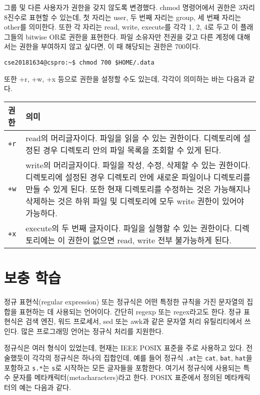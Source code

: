 그룹 및 다른 사용자가 권한을 갖지 않도록 변경했다. chmod 명령어에서 권한은 3자리 8진수로 표현할 수 있는데, 첫 자리는 user, 두 번째 자리는 group, 세 번째 자리는 other를 의미한다. 또한 각 자리는 read, write, execute를 각각 1, 2, 4로 두고 이 플래그들의 bitwise OR로 권한을 표현한다. 파일 소유자만 전권을 갖고 다른 계정에 대해서는 권한을 부여하지 않고 싶다면, 이 때 해당되는 권한은 700이다.
\begin{verbatim}
cse20181634@cspro:~$ chmod 700 $HOME/.data
\end{verbatim}

또한 +r, +w, +x 등으로 권한을 설정할 수도 있는데, 각각이 의미하는 바는 다음과 같다.

\begin{tabularx}{\textwidth}{l|X}
	권한 & 의미 \\
	\hline
	\texttt{+r} & read의 머리글자이다. 파일을 읽을 수 있는 권한이다. 디렉토리에 설정된 경우 디렉토리 안의 파일 목록을 조회할 수 있게 된다. \\
	\texttt{+w} & write의 머리글자이다. 파일을 작성, 수정, 삭제할 수 있는 권한이다. 디렉토리에 설정된 경우 디렉토리 안에 새로운 파일이나 디렉토리를 만들 수 있게 된다. 또한 현재 디렉토리를 수정하는 것은 가능해지나 삭제하는 것은 하위 파일 및 디렉토리에 모두 write 권한이 있어야 가능하다. \\
	\texttt{+x} & execute의 두 번째 글자이다. 파일을 실행할 수 있는 권한이다. 디렉토리에는 이 권한이 없으면 read, write 전부 불가능하게 된다.
\end{tabularx}

\section{보충 학습}
정규 표현식(regular expression) 또는 정규식은 어떤 특정한 규칙을 가진 문자열의 집합을 표현하는 데 사용되는 언어이다. 간단히 regexp 또는 regex라고도 한다. 정규 표현식은 검색 엔진, 워드 프로세서, sed 또는 awk과 같은 문자열 처리 유틸리티에서 쓰인다. 많은 프로그래밍 언어는 정규식 처리를 지원한다.

정규식은 여러 형식이 있었는데, 현재는 IEEE POSIX 표준을 주로 사용하고 있다. 전술했듯이 각각의 정규식은 하나의 집합인데, 예를 들어 정규식 \texttt{.at}는 \texttt{cat}, \texttt{bat}, \texttt{hat}을 포함하고 \texttt{s.*}는 \texttt{s}로 시작하는 모든 글자들을 포함한다. 여기서 정규식에 사용되는 특수 문자를 메타캐릭터(metacharacters)라고 한다. POSIX 표준에서 정의된 메타캐릭터의 예는 다음과 같다.

